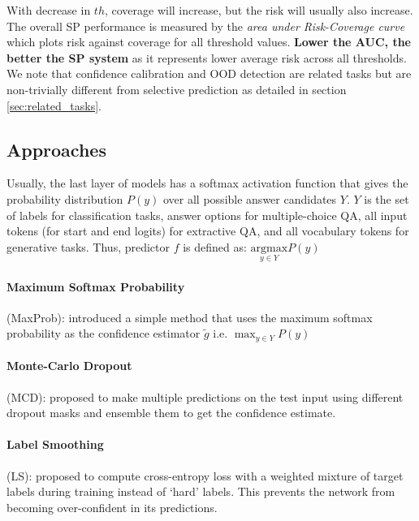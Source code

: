 \documentclass[11pt]{article}
\begin{document}
With decrease in $th$, coverage will increase, but the risk will usually also increase.
The overall SP performance is measured by the \textit{area under Risk-Coverage curve} \cite{el2010foundations} which plots risk against coverage for all threshold values.
\textbf{Lower the AUC, the better the SP system} as it represents lower average risk across all thresholds.
We note that confidence calibration and OOD detection are related tasks but are non-trivially different from selective prediction as detailed in section \ref{sec:related_tasks}.

\subsection{Approaches}

Usually, the last layer of models has a softmax activation function that gives the probability distribution $P(y)$ over all possible answer candidates $Y$. $Y$ is the set of labels for classification tasks, answer options for multiple-choice QA, all input tokens (for start and end logits) for extractive QA, and all vocabulary tokens for generative tasks.
Thus, predictor $f$ is defined as: $\underset{y \in Y}{\mathrm{argmax}} P(y)$

\paragraph{Maximum Softmax Probability} (MaxProb):
\citet{hendrycks17baseline} introduced a simple method that uses the maximum softmax probability as the confidence estimator $\tilde{g}$ i.e. $\max_{y \in Y} P(y)$

\paragraph{Monte-Carlo Dropout} (MCD):
\citet{gal2016dropout} proposed to make multiple predictions on the test input using different dropout masks and ensemble them to get the confidence estimate.

\paragraph{Label Smoothing} (LS):
\citet{Szegedy2016RethinkingTI} proposed to compute cross-entropy loss with a weighted mixture of target labels during training instead of `hard' labels.
This prevents the network from becoming over-confident in its predictions.
\end{document}
